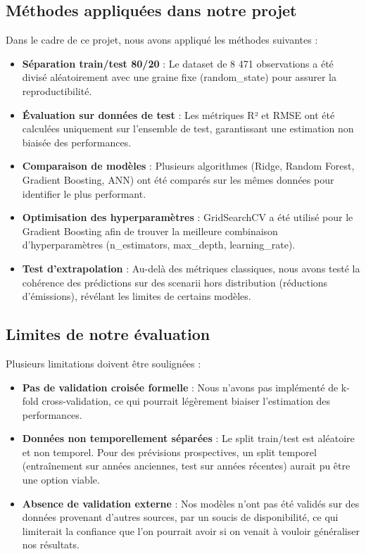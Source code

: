 \documentclass[11pt,a4paper]{article}
\begin{document}
\subsection{Méthodes appliquées dans notre projet}

Dans le cadre de ce projet, nous avons appliqué les méthodes suivantes :

\begin{itemize}[noitemsep]
    \item \textbf{Séparation train/test 80/20} : Le dataset de 8 471 observations a été divisé aléatoirement avec une graine fixe (random\_state) pour assurer la reproductibilité.
    
    \item \textbf{Évaluation sur données de test} : Les métriques R² et RMSE ont été calculées uniquement sur l'ensemble de test, garantissant une estimation non biaisée des performances.
    
    \item \textbf{Comparaison de modèles} : Plusieurs algorithmes (Ridge, Random Forest, Gradient Boosting, ANN) ont été comparés sur les mêmes données pour identifier le plus performant.
    
    \item \textbf{Optimisation des hyperparamètres} : GridSearchCV a été utilisé pour le Gradient Boosting afin de trouver la meilleure combinaison d'hyperparamètres (n\_estimators, max\_depth, learning\_rate).
    
    \item \textbf{Test d'extrapolation} : Au-delà des métriques classiques, nous avons testé la cohérence des prédictions sur des scenarii hors distribution (réductions d'émissions), révélant les limites de certains modèles.
\end{itemize}

\subsection{Limites de notre évaluation}

Plusieurs limitations doivent être soulignées :

\begin{itemize}[noitemsep]
    \item \textbf{Pas de validation croisée formelle} : Nous n'avons pas implémenté de k-fold cross-validation, ce qui pourrait légèrement biaiser l'estimation des performances.
    
    \item \textbf{Données non temporellement séparées} : Le split train/test est aléatoire et non temporel. Pour des prévisions prospectives, un split temporel (entraînement sur années anciennes, test sur années récentes) aurait pu être une option viable.
    
    \item \textbf{Absence de validation externe} : Nos modèles n'ont pas été validés sur des données provenant d'autres sources, par un soucis de disponibilité, ce qui limiterait la confiance que l'on pourrait avoir si on venait à vouloir généraliser nos résultats.
\end{itemize}
\end{document}
